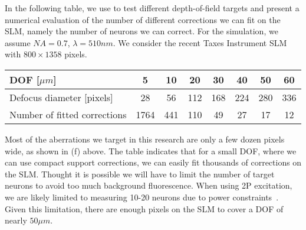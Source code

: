  In the following table, we use   to test different depth-of-field targets and present a numerical evaluation of the number of different corrections we can fit on the SLM, namely the number of neurons we can correct. For the simulation, we assume 
  $NA=0.7$, $\lambda=510 nm$. %
We consider the recent Taxes Instrument SLM~\cite{PLM-TI_2019} with $800\times 1358$ pixels. 
\begin{center}
\begin{tabular}{|l|c|c|c|c|c|c|c|}
	\hline
	DOF [$\mu m$]&5&10&20&30&40&50&60\\\hline
	Defocus diameter [pixels]&28&56&112&   168 &  224&   280&   336\\
	Number of fitted corrections&1764 &        441 &        110  &        49 &         27 &         17  &        12 \\\hline
\end{tabular}
\end{center}
Most of the aberrations we target in this research are only a few dozen pixels wide, as shown in (f) above. The table indicates that for a small DOF, where we can use compact support corrections, we can easily fit thousands of corrections on the SLM. Thought it is possible we will have to limit the number of target neurons to avoid too much background fluorescence. 
When using 2P excitation, we are likely limited to measuring 10-20 neurons due to power constraints~\cite{Davis2024Optical}. Given this limitation, there are enough pixels on the SLM to cover a DOF of nearly $50\mu m$.




